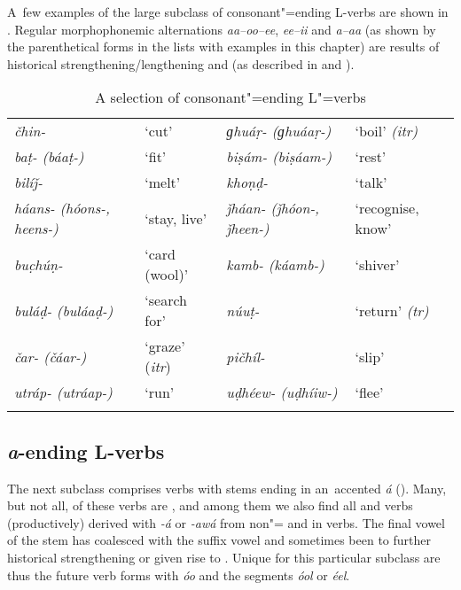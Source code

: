 A~few examples of the large subclass of consonant"=ending L-verbs are shown in . Regular morphophonemic alternations \textit{aa--oo--ee}, \textit{ee--ii} and \textit{a--aa} (as shown by the parenthetical forms in the lists with examples in this chapter) are results of historical strengthening/lengthening and  (as described in  and ). 


\begin{table}
\caption{A selection of consonant"=ending L"=verbs}
\begin{tabularx}{\textwidth}{ Q l Q Q }
\lsptoprule
\textit{čhin-} &
`cut' &
\textit{ɡhuáṛ- (ɡhuáaṛ-)} &
`boil' \textit{(itr)}\\
\textit{baṭ- (báaṭ-)} &
`fit' &
\textit{biṣám- (biṣáam-)} &
`rest'\\
\textit{bilíǰ-} &
`melt' &
\textit{khoṇḍ-} &
`talk'\\
\textit{háans- (hóons-, heens-)} &
`stay, live'
&
\textit{ǰháan- (ǰhóon-, ǰheen-)} &
`recognise, know'\\
\textit{buc̣húṇ-} &
`card (wool)' &
\textit{kamb- (káamb-)} &
`shiver'\\
\textit{buláḍ- (buláaḍ-)} &
`search for' &
\textit{núuṭ-} &
`return' \textit{(tr)}\\
\textit{čar- (čáar-)} &
`graze' (\textit{itr}) &
\textit{pičhíl-} &
`slip'\\
\textit{utráp- (utráap-)} &
`run' &
\textit{uḍhéew- (uḍhíiw-)} &
`flee'\\\lspbottomrule
\end{tabularx}
\label{tab:8-lc}
\end{table}


\subsection{\textit{a}-ending L-verbs}
\label{subsec:8-3-2}

\largerpage[-1]
The next subclass comprises verbs with stems ending in an~accented \textit{á} (). Many, but not all, of these verbs are , and among them we also find all  and  verbs (productively) derived with \textit{-á} or \textit{-awá} from non"= and in verbs. The final vowel of the stem has coalesced with the suffix vowel and sometimes been  to further historical strengthening or given rise to . Unique for this particular subclass are thus the future verb forms with \textit{óo} and the  segments \textit{óol} or \textit{éel}. 



